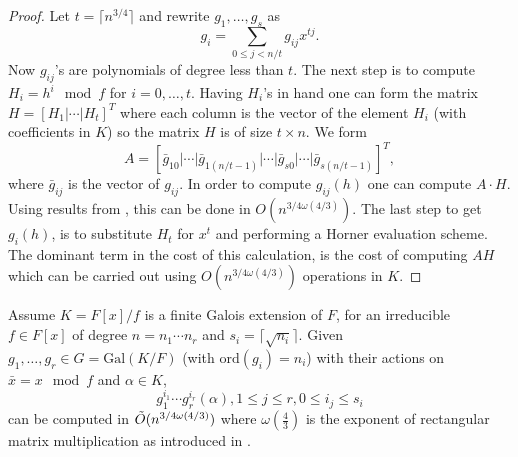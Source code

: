 \begin{proof}
Let $t = \lceil n^{3/4} \rceil$ and rewrite $g_1 , \ldots , g_s$ as 
$$g_i = \sum_{0 \leq j < n/t} g_{ij}x^{tj}.$$
Now $g_{ij}$'s are polynomials of degree less than $t$. The next step is to compute $H_i = h^i \mod f$ for $i = 0 , \ldots , t$.
Having $H_i$'s in hand one can form the matrix $H = \left[ H_1 \vert \cdots \vert H_t \right]^T$ where each column is the vector of 
the element $H_i$ (with coefficients in $K$) so the matrix $H$ is of size $t \times n$. We form 
$$A = \left[\bar{g}_{10}\vert \cdots \vert \bar{g}_{1(n/t-1)}\vert \cdots \vert \bar{g}_{s0}\vert \cdots \vert \bar{g}_{s(n/t-1)}\right]^T,$$
where $\bar{g}_{ij}$ is the  vector of $g_{ij}$. In order to compute $g_{ij}(h)$ one can compute $A \cdot H$. Using 
results from \cite{LeGall}, this can be done in $O(n^{3/4 \omega(4/3)})$. The last step to get $g_i(h)$, is to substitute $H_t$ 
for $x^t$ and performing a Horner evaluation scheme. The dominant term in the cost of this calculation, is the cost of computing $AH$ which can be carried out using $O(n^{3/4 \omega(4/3)})$ operations in $K$.
\end{proof}

\begin{lemma}\cite{Kaltofen}\label{lem:selfcomp}
Assume $K = F[x]/f$ is a finite Galois extension of $F$, for an irreducible $f\in F[x]$ of degree $n = n_1 \cdots n_r$ and $s_i = \lceil\sqrt{n_i}\rceil$. Given $g_1, \ldots , g_{r} \in G = \mathrm{Gal}(K/F)$ (with $\mathrm{ord}(g_i) = n_i$) with their actions on 
$\bar{x}=x \mod f$ and $\alpha \in K$,
$$g_1^{i_1}\cdots g_r^{i_r}(\alpha) , 1 \leq j \leq r, 
0 \leq i_j \leq s_i$$ can be 
computed in $\tilde{O}(n^{3/4 \omega(4/3)})$ where $\omega(\frac{4}{3})$ is the exponent of rectangular matrix 
multiplication as introduced in \cite{LeGall}. 
\end{lemma}

